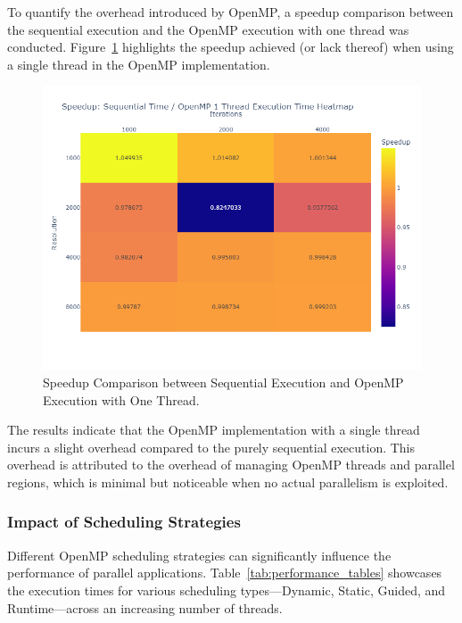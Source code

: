 \documentclass[
	report, %
	11pt, %
]{CSUniSchoolLabReport}
\newcounter{ct}
\begin{document}
To quantify the overhead introduced by OpenMP, a speedup comparison between the sequential execution and the OpenMP execution with one thread was conducted. Figure~\ref{fig:mandelbrot_openMP_1_thread_speedup} highlights the speedup achieved (or lack thereof) when using a single thread in the OpenMP implementation.

\begin{figure}[H]
	\centering
	\captionsetup{justification=centering, width=.8\linewidth}
	\includegraphics[width=\textwidth]{./img/mandelbrot_openmp_1_thread_speedup_heatmap.png}
	\caption{Speedup Comparison between Sequential Execution and OpenMP Execution with One Thread.}
	\label{fig:mandelbrot_openMP_1_thread_speedup}
\end{figure}

The results indicate that the OpenMP implementation with a single thread incurs a slight overhead compared to the purely sequential execution. This overhead is attributed to the overhead of managing OpenMP threads and parallel regions, which is minimal but noticeable when no actual parallelism is exploited.

\subsubsection{Impact of Scheduling Strategies}

Different OpenMP scheduling strategies can significantly influence the performance of parallel applications. Table~\ref{tab:performance_tables} showcases the execution times for various scheduling types—Dynamic, Static, Guided, and Runtime—across an increasing number of threads.
\end{document}
